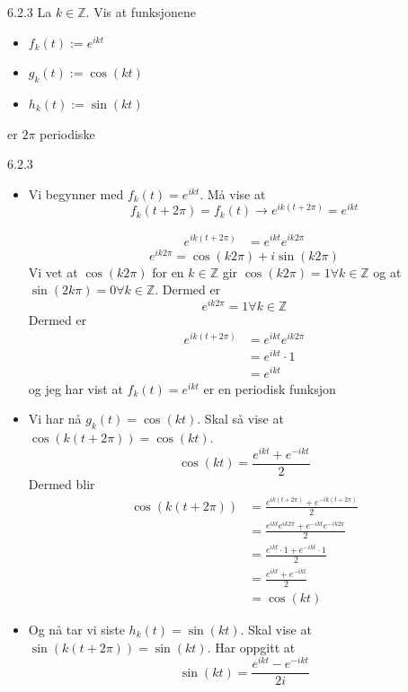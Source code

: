 \documentclass[a4paper,norsk]{article}
\begin{document}
\begin{oppgavebox}{6.2.3}{}
La $ k \in \mathbb{Z} $. Vis at funksjonene 
\begin{itemize}
  \item $ f_k(t) := e^{ikt} $
  \item $ g_k(t) := \cos(kt)   $  
  \item $ h_k(t) := \sin(kt)  $ 
\end{itemize}
er $ 2\pi $ periodiske


\begin{proofbox}{6.2.3}{}
\begin{itemize}
  \item Vi begynner med $ f_k(t) = e^{ikt} $. Må vise at 
  \[
      f_k(t+ 2\pi) = f_k(t) \rightarrow e^{ik \left( t + 2\pi \right) } = e^{ikt}
  \]

  \begin{align*}
    e^{ik \left( t + 2\pi \right) } &= e^{ikt} e^{ik2\pi}
  \end{align*}
  \[
      e^{ik2\pi}  = \cos(k2\pi)  + i \sin(k2\pi) 
  \]
  Vi vet at $ \cos(k 2\pi)   $ for en $ k \in \mathbb{Z} $ gir $ \cos(k 2\pi) =1  \forall k \in \mathbb{Z}$ og at $ \sin(2k \pi) = 0 \forall k \in \mathbb{Z}  $. Dermed er
  \[
      e^{ik2\pi} = 1 \forall k \in  \mathbb{Z}
  \]
  Dermed er 
  \begin{align*}
    e^{ik \left( t + 2\pi \right) } &= e^{ikt} e^{ik2\pi}\\
    &= e^{ikt} \cdot 1\\
    &= e^{ikt}
  \end{align*}
  og jeg har vist at $ f_k(t) = e^{ikt} $  er en periodisk funksjon
  \item Vi har nå $ g_k(t) = \cos(kt)   $. Skal så vise at $ \cos(k \left( t+2\pi \right) ) = \cos(kt)     $. 
  \[
      \cos(kt)  = \frac{ e^{ikt} + e^{-ikt}  }{ 2 }
  \]
  Dermed blir 
  \begin{align*}
    \cos(k \left( t + 2\pi \right) )  &= \frac{ e^{ik \left( t + 2\pi \right) } + e^{-ik \left( t + 2 \pi  \right) }   }{ 2 }\\
    &= \frac{ e^{ikt} e^{ik2 \pi } + e^{-ikt} e^{-ik2 \pi }   }{ 2}\\
    &= \frac{ e^{ikt} \cdot 1 + e^{-ikt} \cdot 1 }{ 2 } \\
    &= \frac{ e^{ikt} + e^{-ikt}  }{ 2 } \\
    &= \cos(kt)  
  \end{align*}
  
  \item Og nå tar vi siste $ h_k(t) = \sin(kt)  $. Skal vise at $ \sin(k \left( t + 2 \pi  \right) ) = \sin(kt)   $. Har oppgitt at
  \[
      \sin(kt) = \frac{ e^{ikt} - e^{-ikt}  }{ 2i }
  \]
  

\end{itemize}
\end{proofbox}
\end{oppgavebox}
\end{document}
